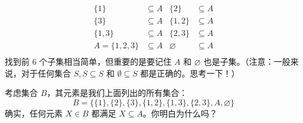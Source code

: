 \begin{align*}
    \{1\} &\subseteq A  & \{2\} &\subseteq A \\
    \{3\} &\subseteq A & \{1,2\} &\subseteq A \\
    \{1,3\} &\subseteq A & \{2,3\} &\subseteq A \\
    A = \{1, 2,3\} &\subseteq A & \varnothing &\subseteq A \\
\end{align*}
找到前 6 个子集相当简单，但重要的是要记住 $A$ 和 $\varnothing$ 也是子集。（注意：一般来说，对于任何集合 $S, S \subseteq S$ 和 $∅ \subseteq S$ 都是正确的。思考一下！）

考虑集合 $B$，其元素是我们上面列出的所有集合：
\[B = \{\{1\}, \{2\}, \{3\}, \{1, 2\}, \{1, 3\}, \{2, 3\}, A, \varnothing\}\]
确实，任何元素 $X \in B$ 都满足 $X \subseteq A$。你明白为什么吗？
